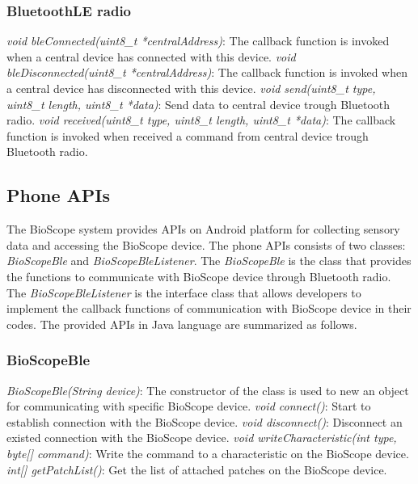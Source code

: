 \subsubsection{BluetoothLE radio}
\textit{void bleConnected(uint8\_t *centralAddress)}: The callback function is invoked when a central device has connected with this device.
\vspace{10pt}
\newline
\textit{void bleDisconnected(uint8\_t *centralAddress)}: The callback function is invoked when a central device has disconnected with this device.
\vspace{10pt}
\newline
\textit{void send(uint8\_t type, uint8\_t  length, uint8\_t *data)}: Send data to central device trough Bluetooth radio.
\vspace{10pt}
\newline
\textit{void received(uint8\_t type, uint8\_t  length, uint8\_t *data)}: The callback function is invoked when received a command from central device trough Bluetooth radio.
\vspace{10pt}
\newline

\subsection{Phone APIs}
The BioScope system provides APIs on Android platform for collecting sensory data and accessing the BioScope device.
The phone APIs consists of two classes: \textit{BioScopeBle} and \textit{BioScopeBleListener}.
The \textit{BioScopeBle} is the class that provides the functions to communicate with BioScope device through Bluetooth radio.
The \textit{BioScopeBleListener} is the interface class that allows developers to implement the callback functions of communication with BioScope device in their codes. The provided APIs in Java language are summarized as follows.

\subsubsection{BioScopeBle}
\textit{BioScopeBle(String device)}: The constructor of the class is used to new an object for communicating with specific BioScope device.
\vspace{10pt}
\newline
\textit{void connect()}: Start to establish connection with the BioScope device.
\vspace{10pt}
\newline
\textit{void disconnect()}: Disconnect an existed connection with the BioScope device.
\vspace{10pt}
\newline
\textit{void writeCharacteristic(int type, byte[] command)}: Write the command to a characteristic on the BioScope device.
\vspace{10pt}
\newline
\textit{int[] getPatchList()}: Get the list of attached patches on the BioScope device.
\vspace{10pt}
\newline

